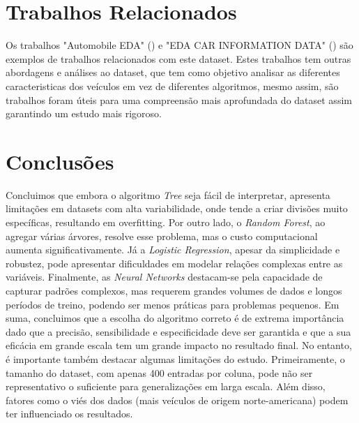 \documentclass[conference]{IEEEtran}
\begin{document}
\section{Trabalhos Relacionados}
Os trabalhos "Automobile EDA" (\cite{ref2}) e "EDA CAR INFORMATION DATA" (\cite{ref3}) são exemplos de trabalhos relacionados com este dataset.
Estes trabalhos tem outras abordagens e análises ao dataset, que tem como objetivo analisar as diferentes caracteristicas dos veículos
em vez de diferentes algoritmos, mesmo assim, são trabalhos foram úteis para uma compreensão mais aprofundada do dataset assim garantindo
um estudo mais rigoroso.

\section{Conclusões}
Concluimos que embora o algoritmo \textit{Tree} seja fácil de interpretar, apresenta limitações em datasets com alta variabilidade,
onde tende a criar divisões muito específicas, resultando em overfitting. Por outro lado, o \textit{Random Forest}, ao agregar várias
árvores, resolve esse problema, mas o custo computacional aumenta significativamente. Já a \textit{Logistic Regression}, apesar da
simplicidade e robustez, pode apresentar dificuldades em modelar relações complexas entre as variáveis. Finalmente, as \textit{Neural Networks}
destacam-se pela capacidade de capturar padrões complexos, mas requerem grandes volumes de dados e longos períodos de treino, podendo
ser menos práticas para problemas pequenos. Em suma, concluimos que a escolha do algoritmo correto é de extrema importância dado que
a precisão, sensibilidade e especificidade deve ser garantida e que a sua eficácia em grande escala tem um grande impacto no resultado final.
No entanto, é importante também destacar algumas limitações do estudo. Primeiramente, o tamanho do dataset, com apenas 400 entradas por coluna,
pode não ser representativo o suficiente para generalizações em larga escala. Além disso, fatores como o viés dos dados
(mais veículos de origem norte-americana) podem ter influenciado os resultados.

\printbibliography
\end{document}
